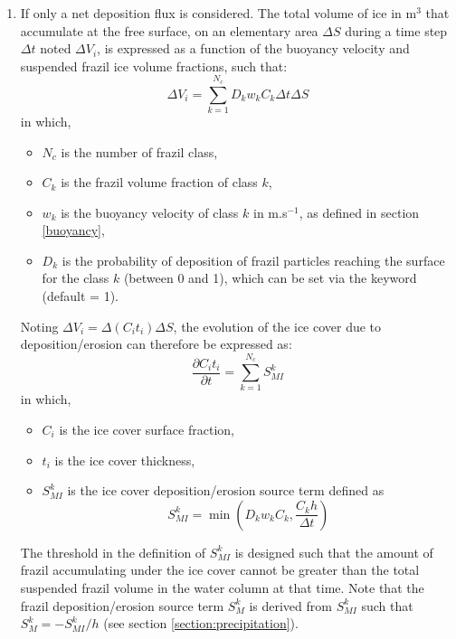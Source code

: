 \begin{enumerate}
\item If  only a net deposition flux is considered.
The total volume of ice in m$^3$ that accumulate at the free surface, on an elementary area $\Delta S$ during a time step $\Delta t$ noted $\Delta V_i$, is expressed as a function of the buoyancy velocity and suspended frazil ice volume fractions, such that:
\begin{equation}
\Delta V_i = \sum_{k=1}^{N_c} D_k w_k C_k  \Delta t \Delta S 
\end{equation}
in which,
\begin{itemize}
  \item $N_c$ is the number of frazil class,
  \item $C_k$ is the frazil volume fraction of class $k$,
  \item $w_k$ is the buoyancy velocity of class $k$ in m.s$^{-1}$, as defined in section \ref{buoyancy},
  \item $D_k$ is the probability of deposition of frazil particles reaching the surface for the class $k$ (between 0 and 1), which can be set via the keyword  (default = 1).
\end{itemize}

Noting $\Delta V_i = \Delta (C_i t_i) \Delta S$, the evolution of the ice cover due to deposition/erosion 
can therefore be expressed as:
\begin{equation}
\dfrac{\partial C_i t_i}{\partial t} = \sum_{k=1}^{N_c} S_{MI}^k
\label{eq:prec}
\end{equation}
in which,
\begin{itemize}
  \item $C_i$ is the ice cover surface fraction,
  \item $t_i$ is the ice cover thickness,
  \item $S_{MI}^k$ is the ice cover deposition/erosion source term defined as 
\begin{equation}
S_{MI}^k = \min \left( D_k w_k C_k, \dfrac{C_k h}{\Delta t} \right)
\end{equation}
\end{itemize}
The threshold in the definition of $S_{MI}^k$ is designed such that the amount of frazil accumulating under the ice cover cannot be greater than the total suspended frazil volume in the water column at that time. Note that the frazil deposition/erosion source term $S_{M}^k$ is derived from $S_{MI}^k$ such that $S_{M}^k = -S_{MI}^k / h$ (see section \ref{section:precipitation}).


\end{enumerate}
